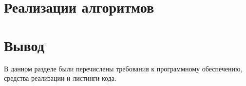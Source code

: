 \clearpage

\section{Реализации алгоритмов}

%
%
%
%
%
%
%
%
%
%
%
%

\section*{Вывод}

В данном разделе были перечислены требования к программному обеспечению, средства реализации и листинги кода.

    